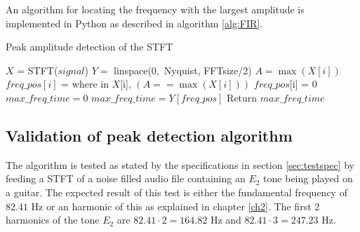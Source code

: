 An algorithm for locating the frequency with the largest amplitude is implemented in Python as described in algorithm \ref{alg:FIR}.
\begin{algorithm}[H]
\caption{Peak amplitude detection of the STFT}
\label{alg:FIR}
\begin{algorithmic}[1]
\State  $X$ = STFT($signal$) 
\State $Y =$ linspace($0,$ Nyquist, FFTsize/2) 
		\State $A = \max(X[i])$ 
		 
			\State $freq\_pos[i]$ = where in $X$[i], $(A == \max(X[i]))$ 
		\Else
			\State $freq\_pos$[i] = 0	
		\EndIf
			\State $max\_freq\_time = 0$
		\Else
			\State $max\_freq\_time = Y[freq\_pos]$
		\EndIf
	\EndFor
	\State Return $max\_freq\_time$
\EndProcedure
\end{algorithmic}
\end{algorithm}

\subsection{Validation of peak detection algorithm}
The algorithm is tested as stated by the specifications in section \ref{sec:testspec} by feeding a STFT of a noise filled audio file containing an $E_2$ tone being played on a guitar.
The expected result of this test is either the fundamental frequency of $82.41$ Hz or an harmonic of this as explained in chapter \ref{ch2}. The first 2 harmonics of the tone $E_2$ are $82.41 \cdot 2 = 164.82$ Hz and $82.41 \cdot 3 = 247.23$ Hz.

